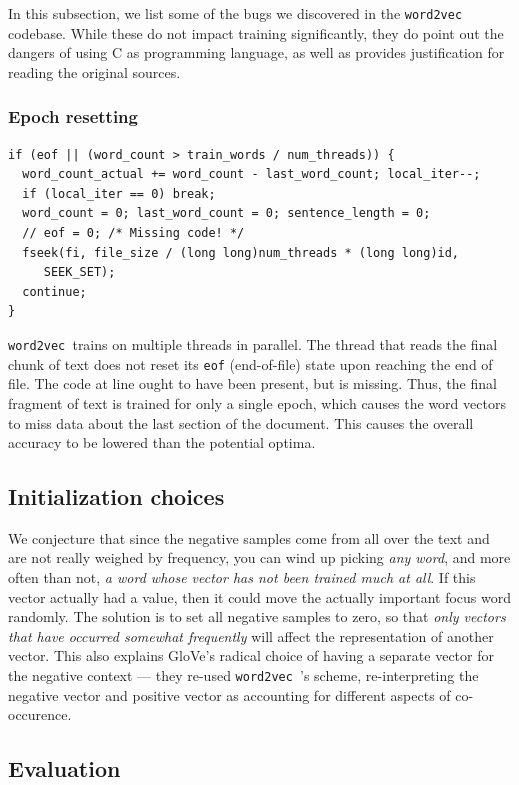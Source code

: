 \documentclass[11pt]{book}
\newcommand*\circled[1]{\tikz[baseline=(char.base)]{
            \node[shape=circle,fill=pairedOneLightBlue,inner sep=1pt] (char) {#1};}}
\newcommand{\wtov}{\texttt{word2vec }}
\begin{document}
In this subsection, we list some of the bugs we discovered in the \wtov
codebase. While these do not impact training significantly, they do point out
the dangers of using C as programming language, as well as provides justification
for reading the original sources.

\subsubsection{Epoch resetting}

\begin{verbatim}
if (eof || (word_count > train_words / num_threads)) {
  word_count_actual += word_count - last_word_count; local_iter--;
  if (local_iter == 0) break;
  word_count = 0; last_word_count = 0; sentence_length = 0;
  // eof = 0; /* Missing code! */
  fseek(fi, file_size / (long long)num_threads * (long long)id,
     SEEK_SET);
  continue;
}
\end{verbatim}

\wtov trains on multiple threads in parallel. The thread that reads
the final chunk of text does not reset its \texttt{eof} (end-of-file) state
upon reaching the end of file. The code at line \circled{5} ought to have been present,
but is missing. Thus, the final fragment of text is trained for only a single
epoch, which causes the word vectors to miss data about the last section of the document.
This causes the overall accuracy  to be lowered than the potential optima.

\subsection{Initialization choices}

We conjecture that since the negative samples come from all over the text and
are not really weighed by frequency, you can wind up picking \emph{any word},
and more often than not, \emph{a word whose vector has not been trained much at
all}.  If this vector actually had a value, then it could move the actually
important focus word randomly. The solution is to set all negative samples to
zero, so that \emph{only vectors that have occurred somewhat frequently} will
affect the representation of another vector. This also explains GloVe's radical
choice of having a separate vector for the negative context --- they re-used
\wtov's  scheme, re-interpreting the negative vector and positive vector as
accounting for different aspects of co-occurence.

\subsection{Evaluation}
\end{document}
